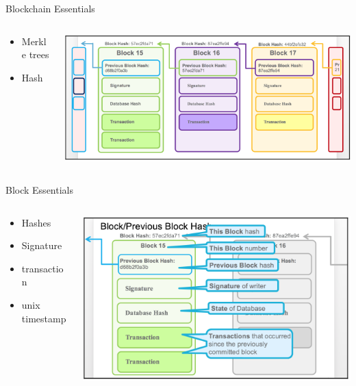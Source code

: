 \documentclass[pdf,table]{beamer}
\begin{document}
\begin{frame}{Blockchain Essentials}
	\begin{columns}[T]
		\begin{column}{0.48\textwidth}
			\begin{itemize}
				\item Merkle trees
				\item Hash
			\end{itemize}
		\end{column}
		\begin{column}{0.48\textwidth}
			\includegraphics[scale=0.45]{blocks}
		\end{column}
	\end{columns}	
\end{frame}

\begin{frame}{Block Essentials}
	\begin{columns}[T]
		\begin{column}{0.48\textwidth}
			\begin{itemize}
				\item Hashes 
				\item Signature
				\item transaction
				\item unix timestamp
			\end{itemize}
		\end{column}
		\begin{column}{0.48\textwidth}
			\includegraphics[scale=0.45]{blockEssential}
		\end{column}
	\end{columns}	
\end{frame}
\end{document}
